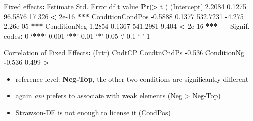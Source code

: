 \documentclass[ignorenonframetext,]{beamer}
\newenvironment{Shaded}{\begin{snugshade}}{\end{snugshade}}
\newcommand{\KeywordTok}[1]{\textcolor[rgb]{0.13,0.29,0.53}{\textbf{#1}}}
\newcommand{\DecValTok}[1]{\textcolor[rgb]{0.00,0.00,0.81}{#1}}
\newcommand{\FloatTok}[1]{\textcolor[rgb]{0.00,0.00,0.81}{#1}}
\newcommand{\StringTok}[1]{\textcolor[rgb]{0.31,0.60,0.02}{#1}}
\newcommand{\OperatorTok}[1]{\textcolor[rgb]{0.81,0.36,0.00}{\textbf{#1}}}
\newcommand{\ErrorTok}[1]{\textcolor[rgb]{0.64,0.00,0.00}{\textbf{#1}}}
\newcommand{\NormalTok}[1]{#1}
\providecommand{\tightlist}{%
  \setlength{\itemsep}{0pt}\setlength{\parskip}{0pt}}
\newcommand{\cond}[1]{\textbf{#1}}
\begin{document}
\begin{frame}[fragile]

\tiny

\begin{Shaded}
\begin{Highlighting}[]
\NormalTok{Fixed effects}\OperatorTok{:}
\StringTok{                 }\NormalTok{Estimate Std. Error       df t value }\KeywordTok{Pr}\NormalTok{(}\OperatorTok{>}\ErrorTok{|}\NormalTok{t}\OperatorTok{|}\NormalTok{)    }
\NormalTok{(Intercept)        }\FloatTok{2.2084}     \FloatTok{0.1275}  \FloatTok{96.5876}  \FloatTok{17.326}  \OperatorTok{<}\StringTok{ }\FloatTok{2e-16} \OperatorTok{**}\ErrorTok{*}
\NormalTok{ConditionCondPos  }\OperatorTok{-}\FloatTok{0.5888}     \FloatTok{0.1377} \FloatTok{532.7231}  \OperatorTok{-}\FloatTok{4.275} \FloatTok{2.26e-05} \OperatorTok{**}\ErrorTok{*}
\NormalTok{ConditionNeg       }\FloatTok{1.2854}     \FloatTok{0.1367} \FloatTok{541.2981}   \FloatTok{9.404}  \OperatorTok{<}\StringTok{ }\FloatTok{2e-16} \OperatorTok{**}\ErrorTok{*}
\OperatorTok{---}
\NormalTok{Signif. codes}\OperatorTok{:}\StringTok{  }\DecValTok{0}\NormalTok{ ‘}\OperatorTok{**}\ErrorTok{*}\NormalTok{’ }\FloatTok{0.001}\NormalTok{ ‘}\OperatorTok{**}\NormalTok{’ }\FloatTok{0.01}\NormalTok{ ‘}\OperatorTok{*}\NormalTok{’ }\FloatTok{0.05}\NormalTok{ ‘.’ }\FloatTok{0.1}\NormalTok{ ‘ ’ }\DecValTok{1}

\NormalTok{Correlation of Fixed Effects}\OperatorTok{:}
\StringTok{            }\NormalTok{(Intr) CndtCP}
\NormalTok{CondtnCndPs }\OperatorTok{-}\FloatTok{0.536}       
\NormalTok{ConditionNg }\OperatorTok{-}\FloatTok{0.536}  \FloatTok{0.499}
\OperatorTok{>}\StringTok{ }
\end{Highlighting}
\end{Shaded}

\normalsize

\begin{itemize}
\tightlist
\item
  reference level: \cond{Neg-Top}, the other two conditions are
  significantly different
\item
  again \emph{ani} prefers to associate with weak elements (Neg
  \textgreater{} Neg-Top)
\item
  Strawson-DE is not enough to license it (CondPos)
\end{itemize}

\end{frame}
\end{document}
